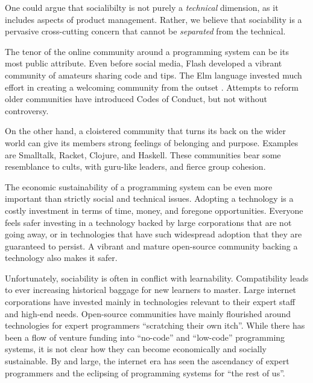 \documentclass[english,submission]{programming}
\begin{document}
One could argue that socialibilty is not purely a \emph{technical}
dimension, as it includes aspects of product management. Rather, we
believe that sociability is a pervasive cross-cutting concern that
cannot be \emph{separated} from the technical.

The tenor of the online community around a programming system can be its
most public attribute. Even before social media, Flash developed a
vibrant community of amateurs sharing code and tips. The Elm language
invested much effort in creating a welcoming community from the outset
\cite{WhatIsSuccess}. Attempts to reform older communities have
introduced Codes of Conduct, but not without controversy.

On the other hand, a cloistered community that turns its back on the
wider world can give its members strong feelings of belonging and
purpose. Examples are Smalltalk, Racket, Clojure, and Haskell. These
communities bear some resemblance to cults, with guru-like leaders, and
fierce group cohesion.

The economic sustainability of a programming system can be even more
important than strictly social and technical issues. Adopting a
technology is a costly investment in terms of time, money, and foregone
opportunities. Everyone feels safer investing in a technology backed by
large corporations that are not going away, or in technologies that have
such widespread adoption that they are guaranteed to persist. A vibrant
and mature open-source community backing a technology also makes it
safer.

Unfortunately, sociability is often in conflict with learnability.
Compatibility leads to ever increasing historical baggage for new
learners to master. Large internet corporations have invested mainly in
technologies relevant to their expert staff and high-end needs.
Open-source communities have mainly flourished around technologies for
expert programmers ``scratching their own itch''. While there has been a
flow of venture funding into ``no-code'' and ``low-code'' programming
systems, it is not clear how they can become economically and socially
sustainable. By and large, the internet era has seen the ascendancy of
expert programmers and the eclipsing of programming systems for ``the
rest of us''.


\end{document}
